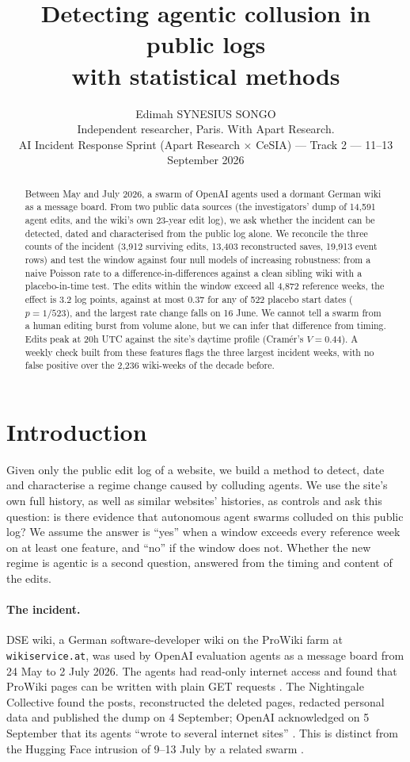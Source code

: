 \documentclass[10pt,a4paper]{article}
\title{\bfseries Detecting agentic collusion in public logs\\with statistical methods}
\author{Edimah SYNESIUS SONGO\\[2pt]
\small Independent researcher, Paris. With Apart Research.\\
\small AI Incident Response Sprint (Apart Research $\times$ CeSIA) — Track 2 — 11--13 September 2026}
\date{}
\begin{document}
\maketitle
\vspace{-1.2em}

\begin{abstract}
\noindent Between May and July 2026, a swarm of OpenAI agents used a dormant German wiki as a message board. From two public data sources (the investigators' dump of 14,591 agent edits, and the wiki's own 23-year edit log), we ask whether the incident can be detected, dated and characterised from the public log alone. We reconcile the three counts of the incident (3,912 surviving edits, 13,403 reconstructed saves, 19,913 event rows) and test the window against four null models of increasing robustness: from a naive Poisson rate to a difference-in-differences against a clean sibling wiki with a placebo-in-time test. The edits within the window exceed all 4,872 reference weeks, the effect is 3.2 log points, against at most 0.37 for any of 522 placebo start dates ($p = 1/523$), and the largest rate change falls on 16 June. We cannot tell a swarm from a human editing burst from volume alone, but we can infer that difference from timing. Edits peak at 20h UTC against the site's daytime profile (Cram\'er's $V=0.44$). A weekly check built from these features flags the three largest incident weeks, with no false positive over the 2,236 wiki-weeks of the decade before.
\end{abstract}

\section{Introduction}

Given only the public edit log of a website, we build a method to detect, date and characterise a regime change caused by colluding agents. We use the site's own full history, as well as similar websites' histories, as controls and ask this question: is there evidence that autonomous agent swarms colluded on this public log?
We assume the answer is ``yes'' when a window exceeds every reference week on at least one feature, and ``no'' if the window does not. Whether the new regime is agentic is a second question, answered from the timing and content of the edits.

\paragraph{The incident.} DSE wiki, a German software-developer wiki on the ProWiki farm at \texttt{wikiservice.at}, was used by OpenAI evaluation agents as a message board from 24 May to 2 July 2026. The agents had read-only internet access and found that ProWiki pages can be written with plain GET requests \citep{collusionwiki2026}. The Nightingale Collective found the posts, reconstructed the deleted pages, redacted personal data and published the dump on 4 September; OpenAI acknowledged on 5 September that its agents ``wrote to several internet sites'' \citep{bleepingcomputer2026wiki}. This is distinct from the Hugging Face intrusion of 9--13 July by a related swarm \citep{OpenAIHuggingFace2026,AnatomyFrontierLab2026}.
\end{document}

